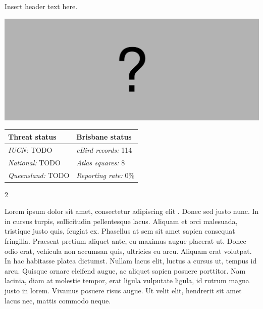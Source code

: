 \documentclass[12pt,openany,oneside]{book}
\let\origfigure\figure
\let\endorigfigure\endfigure
\renewenvironment{figure}[1][2] {
  \expandafter\origfigure\expandafter[H]
} {
  \endorigfigure
}
\let\Begin\begin
\let\End\end
\theoremstyle{definition}
\theoremstyle{definition}
\theoremstyle{definition}
\theoremstyle{remark}
\begin{document}

Insert header text here.

\begin{figure}
\centering
\includegraphics[width=\textwidth,keepaspectratio=true]{assets/misc/missing-profile.png}
\caption{Insert caption here.}
\end{figure}

\begin{tabu} to 
\toprule
Threat status & Brisbane status\\
\midrule
\textit{IUCN:} TODO & \textit{eBird records:} 114\\
\textit{National:} TODO & \textit{Atlas squares:} 8\\
\textit{Queensland:} TODO & \textit{Reporting rate:} 0\%\\
\bottomrule
\end{tabu} 
\vspace{0.15cm}

\Begin{multicols}{2}

Lorem ipsum dolor sit amet, consectetur adipiscing elit
\citep{rexample1, rexample2, rexample3}. Donec sed justo nunc. In in
cursus turpis, sollicitudin pellentesque lacus. Aliquam et orci
malesuada, tristique justo quis, feugiat ex. Phasellus at sem sit amet
sapien consequat fringilla. Praesent pretium aliquet ante, eu maximus
augue placerat ut. Donec odio erat, vehicula non accumsan quis,
ultricies eu arcu. Aliquam erat volutpat. In hac habitasse platea
dictumst. Nullam lacus elit, luctus a cursus ut, tempus id arcu. Quisque
ornare eleifend augue, ac aliquet sapien posuere porttitor. Nam lacinia,
diam at molestie tempor, erat ligula vulputate ligula, id rutrum magna
justo in lorem. Vivamus posuere risus augue. Ut velit elit, hendrerit
sit amet lacus nec, mattis commodo neque.

\End{multicols}

\clearpage
\end{document}
